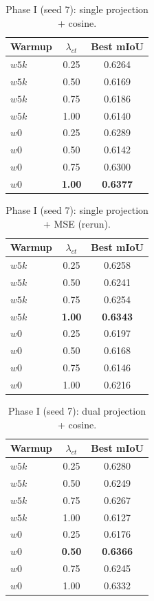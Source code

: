 \begin{table}[t]
\centering
\caption{Phase I (seed 7): single projection + cosine.}
\label{tab:ct-p1-single-cos}
\begin{tabular}{lcc}
\toprule
Warmup & $\lambda_{ct}$ & Best mIoU \\
\midrule
$w5k$ & 0.25 & 0.6264 \\
$w5k$ & 0.50 & 0.6169 \\
$w5k$ & 0.75 & 0.6186 \\
$w5k$ & 1.00 & 0.6140 \\
$w0$  & 0.25 & 0.6289 \\
$w0$  & 0.50 & 0.6142 \\
$w0$  & 0.75 & 0.6300 \\
$w0$  & \textbf{1.00} & \textbf{0.6377} \\
\bottomrule
\end{tabular}
\end{table}

\begin{table}[t]
\centering
\caption{Phase I (seed 7): single projection + MSE (rerun).}
\label{tab:ct-p1-single-mse}
\begin{tabular}{lcc}
\toprule
Warmup & $\lambda_{ct}$ & Best mIoU \\
\midrule
$w5k$ & 0.25 & 0.6258 \\
$w5k$ & 0.50 & 0.6241 \\
$w5k$ & 0.75 & 0.6254 \\
$w5k$ & \textbf{1.00} & \textbf{0.6343} \\
$w0$  & 0.25 & 0.6197 \\
$w0$  & 0.50 & 0.6168 \\
$w0$  & 0.75 & 0.6146 \\
$w0$  & 1.00 & 0.6216 \\
\bottomrule
\end{tabular}
\end{table}

\begin{table}[t]
\centering
\caption{Phase I (seed 7): dual projection + cosine.}
\label{tab:ct-p1-dual-cos}
\begin{tabular}{lcc}
\toprule
Warmup & $\lambda_{ct}$ & Best mIoU \\
\midrule
$w5k$ & 0.25 & 0.6280 \\
$w5k$ & 0.50 & 0.6249 \\
$w5k$ & 0.75 & 0.6267 \\
$w5k$ & 1.00 & 0.6127 \\
$w0$  & 0.25 & 0.6176 \\
$w0$  & \textbf{0.50} & \textbf{0.6366} \\
$w0$  & 0.75 & 0.6245 \\
$w0$  & 1.00 & 0.6332 \\
\bottomrule
\end{tabular}
\end{table}

